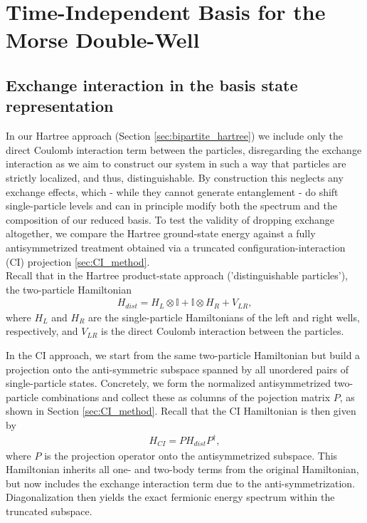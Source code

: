 \documentclass{subfiles}
\begin{document}
\section{Time-Independent Basis for the Morse Double-Well}\label{sec:time_independent_basis}


\subsection{Exchange interaction in the basis state representation}
In our Hartree approach (Section \ref{sec:bipartite_hartree}) we include only the direct Coulomb interaction term between the particles, disregarding the exchange interaction as we aim to construct our system in such a way that particles are strictly localized, and thus, distinguishable. By construction this neglects any exchange effects, which - while they cannot generate entanglement - do shift single-particle levels and can in principle modify both the spectrum and the composition of our reduced basis. To test the validity of dropping exchange altogether, we compare the Hartree ground-state energy against a fully antisymmetrized treatment obtained via a truncated configuration-interaction (CI) projection \ref{sec:CI_method}. \\ 

Recall that in the Hartree product-state approach ('distinguishable particles'), the two-particle Hamiltonian
\begin{align*}
    H_{dist} = H_L \otimes \mathbb{I} + \mathbb{I} \otimes H_R + V_{LR},
\end{align*}
where $H_L$ and $H_R$ are the single-particle Hamiltonians of the left and right wells, respectively, and $V_{LR}$ is the direct Coulomb interaction between the particles. 

In the CI approach, we start from the same two-particle Hamiltonian but build a projection onto the anti-symmetric subspace spanned by all unordered pairs of single-particle states. Concretely, we form the normalized antisymmetrized two-particle combinations and  collect these as columns of the pojection matrix $P$, as shown in Section \ref{sec:CI_method}. Recall that the CI Hamiltonian is then given by
\begin{align*}
    H_{CI} = P H_{dist} P^\dagger,
\end{align*}
where $P$ is the projection operator onto the antisymmetrized subspace. This Hamiltonian inherits all one- and two-body terms from the original Hamiltonian, but now includes the exchange interaction term due to the anti-symmetrization. Diagonalization then yields the exact fermionic energy spectrum within the truncated subspace.
\end{document}
